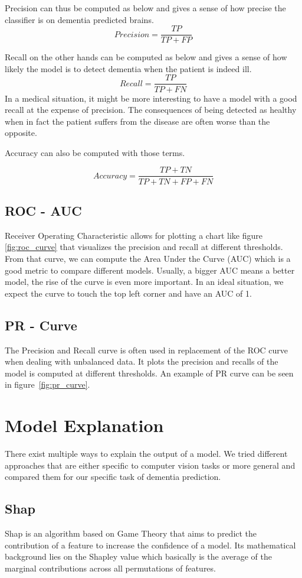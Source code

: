 Precision can thus be computed as below and gives a sense of how precise the classifier is on dementia predicted brains.
$$Precision = \frac{TP}{TP +  FP}$$

Recall on the other hands can be computed as below and gives a sense of how likely the model is to detect dementia when the patient is indeed ill.
$$Recall =\frac{TP}{TP + FN}$$
In a medical situation, it might be more interesting to have a model with a good recall at the expense of precision. The consequences of being detected as healthy when in fact the patient suffers from the disease are often worse than the opposite. 

Accuracy can also be computed with those terms.


$$Accuracy = \frac{TP + TN}{TP + TN + FP + FN}$$


\subsection{ROC - AUC}
Receiver Operating Characteristic allows for plotting a chart like figure \ref{fig:roc_curve} that visualizes the precision and recall at different thresholds. From that curve, we can compute the Area Under the Curve (AUC) which is a good metric to compare different models. Usually, a bigger AUC means a better model, the rise of the curve is even more important.
In an ideal situation, we expect the curve to touch the top left corner and have an AUC of 1.

\subsection{PR - Curve}
The Precision and Recall curve is often used in replacement of the ROC curve when dealing with unbalanced data. It plots the precision and recalls of the model is computed at different thresholds. An example of PR curve can be seen in figure~\ref{fig:pr_curve}.

\section{Model Explanation}
\label{sec:model_explaination}
There exist multiple ways to explain the output of a model. We tried different approaches that are either specific to computer vision tasks or more general and compared them for our specific task of dementia prediction.

\subsection{Shap}
Shap is an algorithm based on Game Theory that aims to predict the contribution of a feature to increase the confidence of a model. Its mathematical background lies on the Shapley value which basically is the average of the marginal contributions across all permutations of features.

